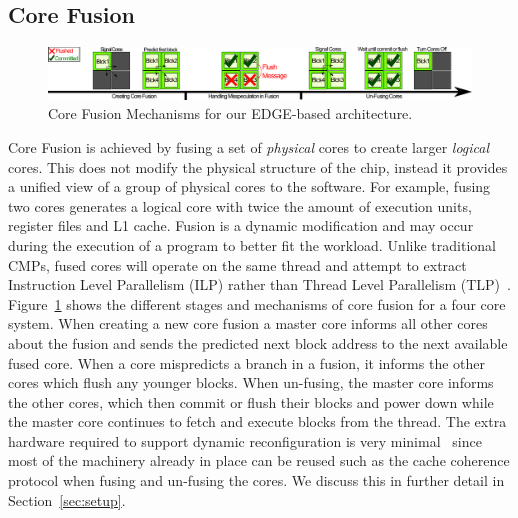 \subsection{Core Fusion}
 \begin{figure}[t]
 \center
 \includegraphics[width=1\textwidth]{cases-paper/graphics/background/proc_test.pdf}
 \caption{Core Fusion Mechanisms for our EDGE-based architecture.}\label{fig:dmp}
 \end{figure}
 
Core Fusion is achieved by fusing a set of \textit{physical} cores to create larger \textit{logical} cores.
This does not modify the physical structure of the chip, instead it provides a unified view of a group of physical cores to the software.
For example, fusing two cores generates a logical core with twice the amount of execution units, register files and L1 cache.
Fusion is a dynamic modification and may occur during the execution of a program to better fit the workload.
Unlike traditional CMPs, fused cores will operate on the same thread and attempt to extract Instruction Level Parallelism (ILP) rather than Thread Level Parallelism (TLP)~\cite{micolet2016dmpstream,pricopi2012bahurupi}.
Figure~\ref{fig:dmp} shows the different stages and mechanisms of core fusion for a four core system.
When creating a new core fusion a master core informs all other cores about the fusion and sends the predicted next block address to the next available fused core.
When a core mispredicts a branch in a fusion, it informs the other cores which flush any younger blocks.
When un-fusing, the master core informs the other cores, which then commit or flush their blocks and power down while the master core continues to fetch and execute blocks from the thread.
The extra hardware required to support dynamic reconfiguration is very minimal~\cite{kim2007tflex} since most of the machinery already in place can be reused such as the cache coherence protocol when fusing and un-fusing the cores.
We discuss this in further detail in Section~\ref{sec:setup}.


